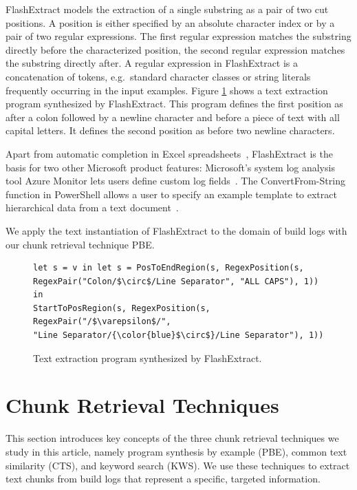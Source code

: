 FlashExtract models the extraction of a single substring as a pair of
two cut positions.
A position is either specified by an absolute
character index or by a pair of two regular expressions.
The first
regular expression matches the substring directly before the
characterized position, the second regular expression matches the
substring directly after.
A regular expression in FlashExtract is a
concatenation of tokens, e.g.\ standard character classes or string
literals frequently occurring in the input examples.
Figure
\ref{lst:prose-program} shows a text extraction program synthesized by
FlashExtract.
This program defines the first position as after a colon
followed by a newline character and before a piece of text with all
capital letters.
It defines the second position as before two newline
characters.

Apart from automatic completion in Excel
spreadsheets~\cite{excel2019flashfill}, FlashExtract is the basis for
two other Microsoft product features: Microsoft's system log analysis
tool Azure Monitor lets users define custom log
fields~\cite{azure2019custom}.
The ConvertFrom-String function in
PowerShell allows a user to specify an example template to extract
hierarchical data from a text document~\cite{powershell2019convert}.

We apply the text instantiation of FlashExtract to the domain of build
logs with our chunk retrieval technique PBE\@.

\begin{figure}[!t]
  \centering
  \begin{lstlisting}[breaklines=true]
let s = v in let s = PosToEndRegion(s, RegexPosition(s,
RegexPair("Colon/$\circ$/Line Separator", "ALL CAPS"), 1)) in
StartToPosRegion(s, RegexPosition(s, RegexPair("/$\varepsilon$/",
"Line Separator/{\color{blue}$\circ$}/Line Separator"), 1))
  \end{lstlisting}
  \caption{Text extraction program synthesized by FlashExtract.}
  \label{lst:prose-program}
\end{figure}

\section{Chunk Retrieval Techniques}
\label{sec:techniques}
This section introduces key concepts of the three chunk retrieval
techniques we study in this article, namely program synthesis by
example (PBE), common text similarity (CTS), and keyword search (KWS).
We use these techniques to extract text chunks from build logs that
represent a specific, targeted information.

